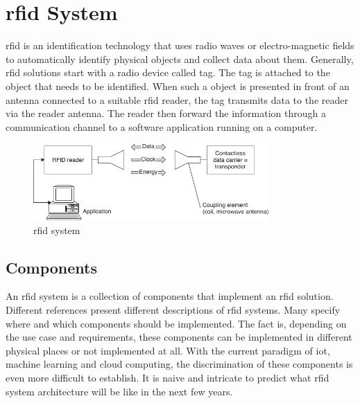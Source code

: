 \section{\ac{rfid} System}


\ac{rfid} is an identification technology that uses radio waves or electro-magnetic fields to automatically identify physical objects and collect data about them.
Generally, \ac{rfid} solutions start with a radio device called tag. The tag is attached to the object that needs to be identified. When such a object is presented in front of an antenna connected to a suitable \ac{rfid} reader, the tag transmits data to the reader via the reader antenna. The reader then forward the information through a communication channel to a software application running on a computer.

\begin{figure}[!ht]
    \centering
    \includegraphics[width=0.8\textwidth]{./figs/02-state-of-the-art/rfid_system.pdf}
    \caption{\ac{rfid} system~\cite{finkenzellerRFIDHandbookFundamentals2003}} 
    \label{fig:rfidsystem}
\end{figure}

\subsection{Components}

An \ac{rfid} system is a collection of components that implement an \ac{rfid} solution.
Different references present different descriptions of \ac{rfid} systems. Many specify where and which components should be implemented.
The fact is, depending on the use case and requirements, these components can be implemented in different physical places or not implemented at all. With the current paradigm of \ac{iot}, machine learning and cloud computing, the discrimination of these components is even more difficult to establish. It is naive and intricate to predict what \ac{rfid} system architecture will be like in the next few years.

